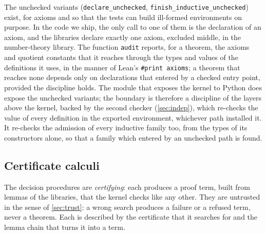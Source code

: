 The unchecked variants (\texttt{declare\_unchecked}, \texttt{finish\_inductive\_unchecked}) exist, for axioms and so that the tests can build ill-formed environments on purpose.
In the code we ship, the only call to one of them is the declaration of an axiom, and the libraries declare exactly one axiom, excluded middle, in the number-theory library.
The function \texttt{audit} reports, for a theorem, the axioms and quotient constants that it reaches through the types and values of the definitions it uses, in the manner of Lean's \texttt{\#print axioms}; a theorem that reaches none depends only on declarations that entered by a checked entry point, provided the discipline holds.
The module that exposes the kernel to Python does expose the unchecked variants; the boundary is therefore a discipline of the layers above the kernel, backed by the second checker (\cref{sec:indep}), which re-checks the value of every definition in the exported environment, whichever path installed it.
It re-checks the admission of every inductive family too, from the types of its constructors alone, so that a family which entered by an unchecked path is found.

\subsection{Certificate calculi}\label{sec:certificates}

The decision procedures are \emph{certifying}: each produces a proof term, built from lemmas of the libraries, that the kernel checks like any other.
They are untrusted in the sense of \cref{sec:trust}: a wrong search produces a failure or a refused term, never a theorem.
Each is described by the certificate that it searches for and the lemma chain that turns it into a term.

